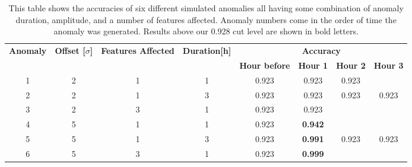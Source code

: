 \documentclass[5p]{elsarticle}
\begin{document}
\begin{table}[htbp]
\centering
\caption{This table shows the accuracies of six different simulated anomalies all having some combination of anomaly duration, amplitude, and a number of features affected. Anomaly numbers come in the order of time the anomaly was generated. Results above our 0.928 cut level are shown in bold letters.}
\label{table:nntonfixed}
\resizebox{\linewidth}{!} {%
\begin{tabular}{@{}cccccccc@{}}
\toprule
\multirow{2}{*}{\textbf{Anomaly}} & \multirow{2}{*}{\textbf{Offset {[}$\sigma${]}}} & \multirow{2}{*}{\textbf{Features Affected}} & \multirow{2}{*}{\textbf{Duration{[}h{]}}} & \multicolumn{4}{c}{\textbf{Accuracy}}                                     \\ \cmidrule(l){5-8} 
                                  &                                                 &                                             &                                           & \textbf{Hour before} & \textbf{Hour 1} & \textbf{Hour 2} & \textbf{Hour 3} \\ \midrule
1                                 & 2                                               & 1                                           & 1                                         & 0.923                & 0.923  &     0.923            &                 \\
2                                 & 2                                               & 1                                           & 3                                         & 0.923                & 0.923  & 0.923  & 0.923           \\
3                                 & 2                                               & 3                                           & 1                                         & 0.923                & 0.923  &                 &                 \\
4                                 & 5                                               & 1                                           & 1                                         & 0.923                & \textbf{0.942}  &                 &                 \\
5                                 & 5                                               & 1                                           & 3                                         & 0.923                & \textbf{0.991}  & 0.923  & 0.923           \\
6                                 & 5                                               & 3                                           & 1                                         & 0.923                & \textbf{0.999}  &                 &                 \\ 
\bottomrule
\end{tabular}%
}
\end{table}
\end{document}

